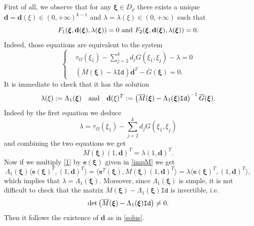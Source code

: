 \documentclass[11pt,a4paper]{amsart}
\newcommand{\ee}{{\mathtt e}}
\theoremstyle{definition}
\renewcommand{\(}{\left(}
\renewcommand{\)}{\right)}
\begin{document}
First of all, we observe that for any $\boldsymbol\xi\in D_\rho$  there exists a unique $\mathbf{d}=\mathbf{d}(\xi)\in(0, +\infty)^{k-1}$ and
$\lambda=\lambda(\xi)\in (0,+\infty)$ such that 
$$F_1(\boldsymbol\xi, \mathbf{d}(\boldsymbol\xi), \lambda(\boldsymbol\xi))=0\ \hbox{and}\ F_2(\boldsymbol\xi, \mathbf{d}(\boldsymbol\xi), \lambda(\boldsymbol\xi))=0.$$
Indeed, those equations are equivalent to the system
$$\left\{\begin{aligned}& \tau_\Omega(\xi_1)-\sum_{j=2}^k d_j G(\xi_1, \xi_j)-\lambda=0\\
 &\left(\overline M(\boldsymbol\xi)-\lambda \mathtt {Id}\right)\mathbf{d}^T-\overline G(\boldsymbol\xi)=0.\end{aligned}\right.$$
It is immediate to check that it has the solution
\begin{equation}\label{solus}\lambda(\xi):=\Lambda_1( \boldsymbol\xi)\quad \hbox{and}\quad  \mathbf d(\xi)^T:=\left( \overline M(\boldsymbol\xi)-\Lambda_1( \boldsymbol\xi) \mathtt {Id} \right)^{-1}\overline G(\boldsymbol\xi).\end{equation}
Indeed by the first equation we deduce
$$\lambda=\tau_\Omega(\xi_1)-\sum_{j=2}^k d_j G(\xi_1, \xi_j)$$
and combining the two equations we get
\begin{equation}\label{1}M(\boldsymbol\xi)(1, \mathbf{d})^T=\lambda (1, \mathbf{d})^T.\end{equation}
Now if we multiply \eqref{1} by $\ee(\boldsymbol\xi)$ given in \eqref{impM} we get
$$\Lambda_1( \boldsymbol\xi)\langle \ee(\boldsymbol\xi)^T, (1, \mathbf{d})^T\rangle=\langle \ee^T(\boldsymbol\xi), M(\boldsymbol\xi)(1, \mathbf{d})^T\rangle =\lambda\langle \ee(\boldsymbol\xi)^T, (1, \mathbf{d})^T\rangle,$$  which implies that
$\lambda=\Lambda_1( \boldsymbol\xi).$ Moreover,  since $\Lambda_1( \boldsymbol\xi)$ is simple, it is not difficult to check that the  matrix $\overline M(\boldsymbol\xi)-\Lambda_1( \boldsymbol\xi) \mathtt {Id}$ is invertible, i.e. 
\begin{equation}\label{solus3}{\rm det}\left(\overline M(\boldsymbol\xi)-\Lambda_1( \boldsymbol\xi) \mathtt {Id}\right)\neq 0.\end{equation}
Then it follows the existence of  $\mathbf d$ as in \eqref{solus}.
\end{document}

